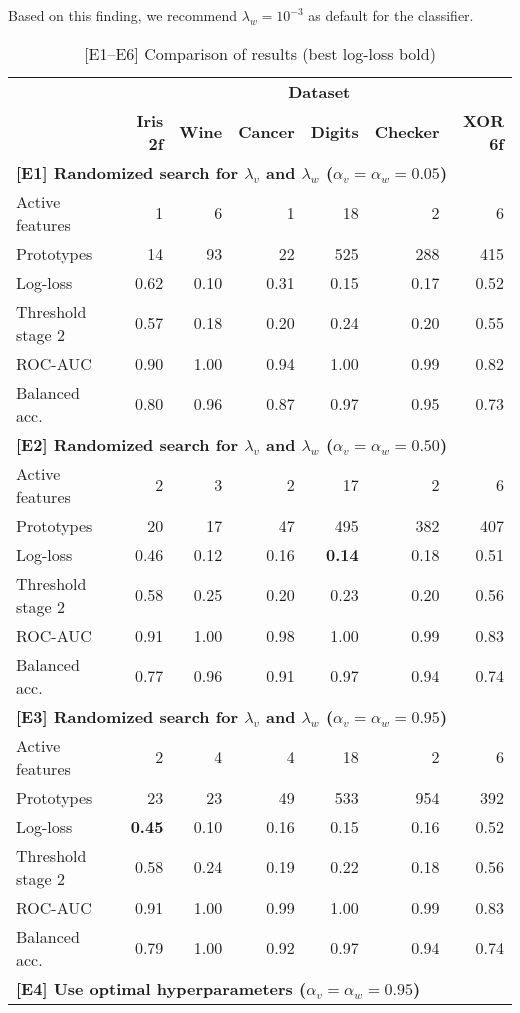 Based on this finding, we recommend $\lambda_w=10^{-3}$ as default for the classifier.\par
%
\begin{table}
\caption{[E1--E6] Comparison of results (best log-loss bold)}
\label{tab_e1_to_e6}
%
\begin{center}
\small
\begin{tabular}{|lrrrrrr|}
\hline
&\multicolumn{6}{c|}{\textbf{\hrulefill\ Dataset \hrulefill}}\\
&\textbf{Iris 2f}&\textbf{Wine}&\textbf{Cancer}&\textbf{Digits}&\textbf{Checker}&\textbf{XOR 6f}\\
\multicolumn{7}{|l|}{\textbf{[E1] Randomized search for $\lambda_v$ and $\lambda_w$ ($\alpha_v=\alpha_w=0.05$)}}\\
Active features&1&6&1&18&2&6\\
Prototypes&14&93&22&525&288&415\\
Log-loss&0.62&0.10&0.31&0.15&0.17&0.52\\
Threshold stage 2&0.57&0.18&0.20&0.24&0.20&0.55\\
ROC-AUC&0.90&1.00&0.94&1.00&0.99&0.82\\
Balanced acc.&0.80&0.96&0.87&0.97&0.95&0.73\\
\multicolumn{7}{|l|}{\textbf{[E2] Randomized search for $\lambda_v$ and $\lambda_w$ ($\alpha_v=\alpha_w=0.50$)}}\\
Active features&2&3&2&17&2&6\\
Prototypes&20&17&47&495&382&407\\
Log-loss&0.46&0.12&0.16&\textbf{0.14}&0.18&0.51\\
Threshold stage 2&0.58&0.25&0.20&0.23&0.20&0.56\\
ROC-AUC&0.91&1.00&0.98&1.00&0.99&0.83\\
Balanced acc.&0.77&0.96&0.91&0.97&0.94&0.74\\
\multicolumn{7}{|l|}{\textbf{[E3] Randomized search for $\lambda_v$ and $\lambda_w$ ($\alpha_v=\alpha_w=0.95$)}}\\
Active features&2&4&4&18&2&6\\
Prototypes&23&23&49&533&954&392\\
Log-loss&\textbf{0.45}&0.10&0.16&0.15&0.16&0.52\\
Threshold stage 2&0.58&0.24&0.19&0.22&0.18&0.56\\
ROC-AUC&0.91&1.00&0.99&1.00&0.99&0.83\\
Balanced acc.&0.79&1.00&0.92&0.97&0.94&0.74\\
\multicolumn{7}{|l|}{\textbf{[E4] Use optimal hyperparameters ($\alpha_v=\alpha_w=0.95$)}}\\

\end{tabular}
\end{center}
\end{table}
